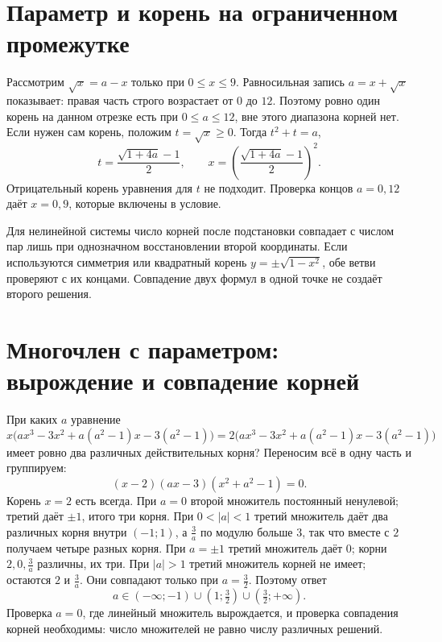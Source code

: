 \section{Параметр и корень на ограниченном промежутке}
\begin{example}\label{ex:review-ege-exam-parameters-3}
Рассмотрим \(\sqrt{x}=a-x\) только при \(0\le x\le9\). Равносильная запись \(a=x+\sqrt{x}\) показывает: правая часть строго возрастает от \(0\) до \(12\). Поэтому ровно один корень на данном отрезке есть при \(0\le a\le12\), вне этого диапазона корней нет. Если нужен сам корень, положим \(t=\sqrt{x}\ge0\). Тогда \(t^2+t=a\),
\[
t=\frac{\sqrt{1+4a}-1}{2},\qquad
x=\left(\frac{\sqrt{1+4a}-1}{2}\right)^2.
\]
Отрицательный корень уравнения для \(t\) не подходит. Проверка концов \(a=0,12\) даёт \(x=0,9\), которые включены в условие.
\end{example}
Для нелинейной системы число корней после подстановки совпадает с числом пар лишь при однозначном восстановлении второй координаты. Если используются симметрия или квадратный корень \(y=\pm\sqrt{1-x^2}\), обе ветви проверяют с их концами. Совпадение двух формул в одной точке не создаёт второго решения.

\section{Многочлен с параметром: вырождение и совпадение корней}
\begin{example}\label{ex:review-ege-exam-parameters-4}
При каких \(a\) уравнение
\[
x\bigl(ax^3-3x^2+a(a^2-1)x-3(a^2-1)\bigr)
=2\bigl(ax^3-3x^2+a(a^2-1)x-3(a^2-1)\bigr)
\]
имеет ровно два различных действительных корня? Переносим всё в одну часть и группируем:
\[
(x-2)(ax-3)(x^2+a^2-1)=0.
\]
Корень \(x=2\) есть всегда. При \(a=0\) второй множитель постоянный ненулевой; третий даёт \(\pm1\), итого три корня. При \(0<|a|<1\) третий множитель даёт два различных корня внутри \((-1;1)\), а \(\frac3a\) по модулю больше \(3\), так что вместе с \(2\) получаем четыре разных корня. При \(a=\pm1\) третий множитель даёт \(0\); корни \(2,0,\frac3a\) различны, их три. При \(|a|>1\) третий множитель корней не имеет; остаются \(2\) и \(\frac3a\). Они совпадают только при \(a=\frac32\). Поэтому ответ
\[
a\in(-\infty;-1)\cup(1;\tfrac32)\cup(\tfrac32;+\infty).
\]
Проверка \(a=0\), где линейный множитель вырождается, и проверка совпадения корней необходимы: число множителей не равно числу различных решений.
\end{example}

